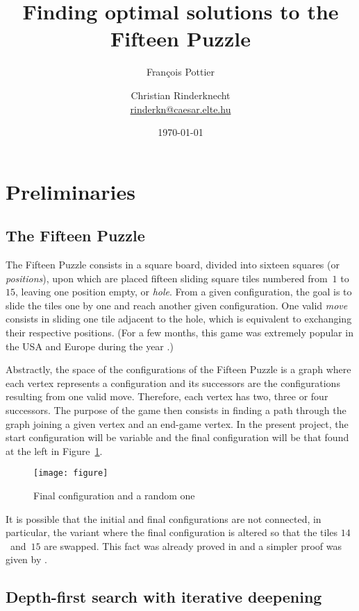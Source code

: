 \documentclass[11pt,a4paper]{article}
\title{Finding optimal solutions to the Fifteen Puzzle}
\author{Fran\c{c}ois Pottier \and Christian Rinderknecht\\
\url{rinderkn@caesar.elte.hu}}
\date{\today}
\begin{document}
\maketitle

\section{Preliminaries}

\subsection{The Fifteen Puzzle}

The Fifteen Puzzle consists in a square board, divided into sixteen
squares (or \emph{positions}), upon which are placed fifteen sliding
square tiles numbered from~\(1\) to~\(15\), leaving one position
empty, or \emph{hole}. From a given configuration, the goal is to
slide the tiles one by one and reach another given configuration. One
valid \emph{move} consists in sliding one tile adjacent to the hole,
which is equivalent to exchanging their respective positions. (For a
few months, this game was extremely popular in the USA and Europe
during the year .)

Abstractly, the space of the configurations of the Fifteen Puzzle is a
graph where each vertex represents a configuration and its successors
are the configurations resulting from one valid move. Therefore, each
vertex has two, three or four successors. The purpose of the game then
consists in finding a path through the graph joining a given vertex
and an end\hyp{}game vertex. In the present project, the start
configuration will be variable and the final configuration will be
that found at the left in Figure~\ref{fig:taquin}.
\begin{figure}
\begin{center}
\texttt{[image: figure]}
\end{center}
\caption{Final configuration and a random one
\label{fig:taquin}}
\end{figure}
It is possible that the initial and final configurations are not
connected, in particular, the variant where the final configuration is
altered so that the tiles \(14\)~and~\(15\) are swapped. This fact was
already proved in  and a simpler proof was given by
\cite{archer-99}.

\subsection{Depth-first search with iterative deepening}
\end{document}
